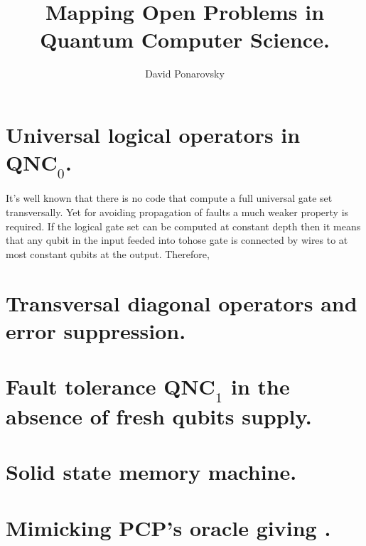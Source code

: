 \documentclass[manuscript,screen,review]{acmart}
\begin{document}

\title{ Mapping Open Problems in Quantum Computer Science.}
\author{David Ponarovsky}
\maketitle

\newcommand*{\Mbas}{\mathcal{X}^\prime}
\newcommand*{\bas}{\mathcal{X}}
\newcommand*{\sMbas}{\Mbas}
\newcommand*{\QQ}{C_{X}/C_{Z}^\perp }
\newcommand*{\trig}{ Triorthogonal }
\newcommand*{\Hyp}{ Hyperproduct }
\newcommand*{\Cin}{ C_{\text{initial}} }
\newcommand*{\Ctan}{ C_{\text{Tan}} }

\section*{Universal logical operators in $\textbf{QNC}_{0}$.  }
It's well known that there is no code that compute a full universal gate set transversally. Yet for avoiding propagation of faults a much weaker property is required. If the logical gate set can be computed at constant depth then it means that any qubit in the input feeded into tohose gate is connected by wires to at most constant qubits at the output. Therefore,    
\section{Transversal diagonal operators and error suppression.  }
\section{Fault tolerance $\textbf{QNC}_{1}$ in the absence of fresh qubits supply.  }
\section{Solid state memory machine.}
\section{Mimicking PCP's oracle giving .}
\printbibliography
\end{document}
